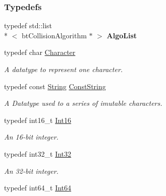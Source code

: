 \subsubsection*{Typedefs}
\begin{DoxyCompactItemize}
\item 
\hypertarget{namespaceMezzanine_af18eb4e539728524f1a64ba1726ad9cc}{typedef std\-::list\\*
$<$ bt\-Collision\-Algorithm $\ast$ $>$ {\bfseries Algo\-List}}\label{namespaceMezzanine_af18eb4e539728524f1a64ba1726ad9cc}

\item 
typedef char \hyperlink{namespaceMezzanine_ad5147a419db7627ee552a2b582f1052d}{Character}
\begin{DoxyCompactList}\small\item\em A datatype to represent one character. \end{DoxyCompactList}\item 
typedef const \hyperlink{namespaceMezzanine_acf9fcc130e6ebf08e3d8491aebcf1c86}{String} \hyperlink{namespaceMezzanine_a63cd699ac54b73953f35ec9cfc05e506}{Const\-String}
\begin{DoxyCompactList}\small\item\em A Datatype used to a series of imutable characters. \end{DoxyCompactList}\item 
\hypertarget{namespaceMezzanine_adb602bffcbc8f1b381b2f529e9e364f6}{typedef int16\-\_\-t \hyperlink{namespaceMezzanine_adb602bffcbc8f1b381b2f529e9e364f6}{Int16}}\label{namespaceMezzanine_adb602bffcbc8f1b381b2f529e9e364f6}

\begin{DoxyCompactList}\small\item\em An 16-\/bit integer. \end{DoxyCompactList}\item 
\hypertarget{namespaceMezzanine_a590a2f3eb4a187e1b25209e546e540e1}{typedef int32\-\_\-t \hyperlink{namespaceMezzanine_a590a2f3eb4a187e1b25209e546e540e1}{Int32}}\label{namespaceMezzanine_a590a2f3eb4a187e1b25209e546e540e1}

\begin{DoxyCompactList}\small\item\em An 32-\/bit integer. \end{DoxyCompactList}\item 
\hypertarget{namespaceMezzanine_ab203dfc8311caab7cc86ee5a0bf962ed}{typedef int64\-\_\-t \hyperlink{namespaceMezzanine_ab203dfc8311caab7cc86ee5a0bf962ed}{Int64}}\label{namespaceMezzanine_ab203dfc8311caab7cc86ee5a0bf962ed}


\end{DoxyCompactItemize}
